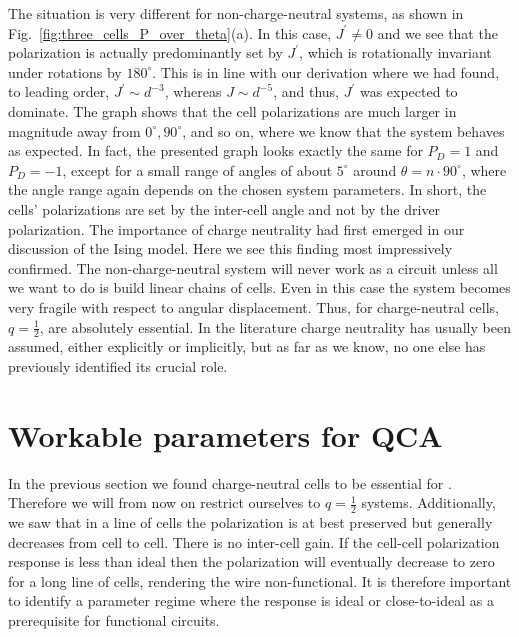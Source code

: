 The situation is very different for non-charge-neutral systems, as shown in
Fig.~\ref{fig:three_cells_P_over_theta}(a). In this case, $J^{\prime} \ne 0$ and
we see that the polarization is actually predominantly set by $J^{\prime}$,
which is rotationally invariant under rotations by $180^{\circ}$. This is in
line with our derivation where we had found, to leading order, $J^{\prime} \sim
d^{-3}$, whereas $J \sim d^{-5}$, and thus, $J^{\prime}$ was expected to
dominate. The graph shows that the cell polarizations are much larger in
magnitude away from $0^{\circ}, 90^{\circ}$, and so on, where we know that the
system behaves as expected. In fact, the presented graph looks exactly the same
for $P_D = 1$ and $P_D = -1$, except for a small range of angles of about
$5^{\circ}$ around $\theta = n \cdot 90^{\circ}$, where the angle range again
depends on the chosen system parameters. In short, the cells' polarizations are
set by the inter-cell angle and not by the driver polarization. The importance
of charge neutrality had first emerged in our discussion of the Ising model.
Here we see this finding most impressively confirmed. The non-charge-neutral
system will never work as a  circuit unless all we want to do is build linear
chains of cells. Even in this case the system becomes very fragile with respect
to angular displacement. Thus, for  charge-neutral cells, $q=\frac{1}{2}$,
are absolutely essential. In the literature charge neutrality has usually been
assumed, either explicitly or implicitly, but as far as we know, no one else has
previously identified its crucial role.


\section{Workable parameters for QCA}

In the previous section we found charge-neutral cells to be essential for
. Therefore we will from now on restrict ourselves to $q=\frac{1}{2}$
systems. Additionally, we saw that in a line of cells the polarization is at
best preserved but generally decreases from cell to cell. There is no inter-cell
gain. If the cell-cell polarization response is less than ideal then the
polarization will eventually decrease to zero for a long line of cells,
rendering the wire non-functional. It is therefore important to identify a
parameter regime where the response is ideal or close-to-ideal as a prerequisite
for functional  circuits.

